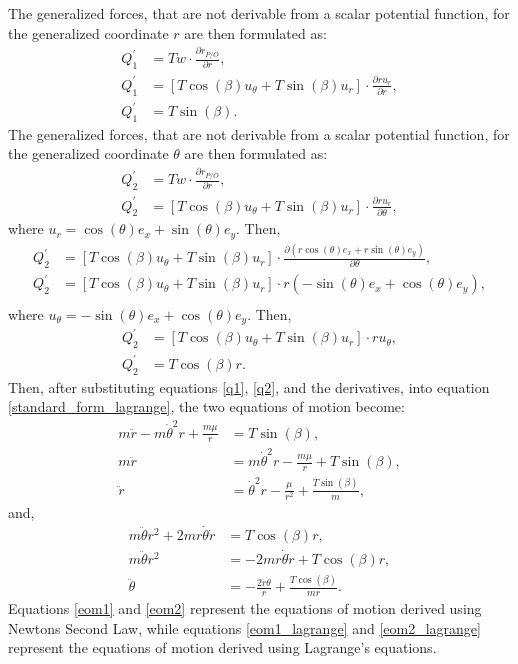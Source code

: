 \documentclass[]{article}
\begin{document}
The generalized forces, that are not derivable from a scalar potential function, for the generalized coordinate \(r\) are then formulated as:
\begin{align}
	Q^{'}_{1} &= Tw \cdot  \frac{\partial r_{P/O}}{\partial r}, \nonumber\\
	Q^{'}_{1} &= [T\cos(\beta)u_{\theta} + T\sin(\beta)u_{r}] \cdot \frac{\partial ru_{r}}{\partial r}, \nonumber\\
	Q^{'}_{1} &= T\sin(\beta) \label{q1}.
\end{align}
The generalized forces, that are not derivable from a scalar potential function, for the generalized coordinate \(\theta\) are then formulated as:
\begin{align*}
	Q^{'}_{2} &= Tw \cdot  \frac{\partial r_{P/O}}{\partial r}, \\
	Q^{'}_{2} &= [T\cos(\beta)u_{\theta} + T\sin(\beta)u_{r}] \cdot \frac{\partial ru_{r}}{\partial \theta},
\end{align*}
where \(u_r = \cos(\theta)e_{x} + \sin(\theta)e_{y}\). Then,
\begin{align*}
	Q^{'}_{2} &= [T\cos(\beta)u_{\theta} + T\sin(\beta)u_{r}] \cdot \frac{\partial (r\cos(\theta)e_{x} + r\sin(\theta)e_{y})}{\partial \theta}, \\
	Q^{'}_{2} &= [T\cos(\beta)u_{\theta} + T\sin(\beta)u_{r}] \cdot r(-\sin(\theta)e_{x} + \cos(\theta)e_{y}), \\
\end{align*}
where \(u_{\theta} = -\sin(\theta)e_{x} + \cos(\theta)e_{y}\). Then,
\begin{align}
	Q^{'}_{2} &= [T\cos(\beta)u_{\theta} + T\sin(\beta)u_{r}] \cdot ru_{\theta}, \nonumber\\
	Q^{'}_{2} &= T\cos(\beta)r. \label{q2}
\end{align}
Then, after substituting equations \ref{q1}, \ref{q2}, and the derivatives, into equation \ref{standard_form_lagrange}, the two equations of motion become:
\begin{align}
 m\ddot{r} - m\dot{\theta}^2r + \frac{m\mu}{r} &= T\sin(\beta), \nonumber\\
 m\ddot{r}                                     &= m\dot{\theta}^2r - \frac{m\mu}{r} + T\sin(\beta), \nonumber\\
 \ddot{r}                                      &= \dot{\theta}^2r - \frac{\mu}{r^2} + \frac{T\sin(\beta)}{m} \label{eom1_lagrange},
\end{align}
and,
\begin{align}
 m\ddot{\theta}r^2 + 2mr\dot{\theta}\dot{r}    &= T\cos(\beta)r, \nonumber\\
 m\ddot{\theta}r^2                             &= -2mr\dot{\theta}\dot{r} + T\cos(\beta)r, \nonumber\\
 \ddot{\theta}                                &= -\frac{2\dot{r}\dot{\theta}}{r}   + \frac{T\cos(\beta)}{mr} \label{eom2_lagrange}.
\end{align}
\vspace{2mm}\newline
Equations \ref{eom1} and \ref{eom2} represent the equations of motion derived using Newtons Second Law, while equations \ref{eom1_lagrange} and \ref{eom2_lagrange} represent the equations of motion derived using Lagrange's equations. 
\end{document}
